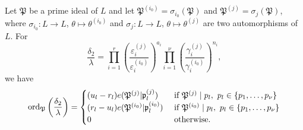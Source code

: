 \begin{lemma}\label{lem:ordpz}
Let $\mathfrak{P}$ be a prime ideal of $L$ and let $\mathfrak{P}^{(i_0)} = \sigma_{i_0}(\mathfrak{P})$ and $\mathfrak{P}^{(j)} = \sigma_{j}(\mathfrak{P})$, where $\sigma_{i_0}: L \to L$, $\theta \mapsto \theta^{(i_0)}$ and $\sigma_{j}: L \to L$, $\theta \mapsto \theta^{(j)}$ are two automorphisms of $L$. For 
\[\frac{\delta_2}{\lambda}= \prod_{i = 1}^{r}\left( \frac{\varepsilon_i^{(j)}}{\varepsilon_i^{(i_0)}}\right)^{a_i} \prod_{i = 1}^{\nu} \left( \frac{\gamma_i^{(j)}}{\gamma_i^{(i_0)}}\right)^{n_i},\]
we have
\[\operatorname{ord}_{\mathfrak{P}}\left(\frac{\delta_2}{\lambda}\right)=
\begin{cases}
(u_l - r_l)e(\mathfrak{P}^{(j)}|\mathfrak{p}_l^{(j)})	
	& \textnormal{ if } \mathfrak{P}^{(j)} \mid p_l , \ p_l \in \{p_1,\dots, p_{\nu}\}\\
(r_l - u_l)e(\mathfrak{P}^{(i_0)}|\mathfrak{p}_l^{(i_0)})
	& \textnormal{ if } \mathfrak{P}^{(i_0)}\mid p_l, \ p_l \in \{p_1,\dots, p_{\nu}\}\\
0 	& \textnormal{ otherwise}.
\end{cases}\]
\end{lemma}
